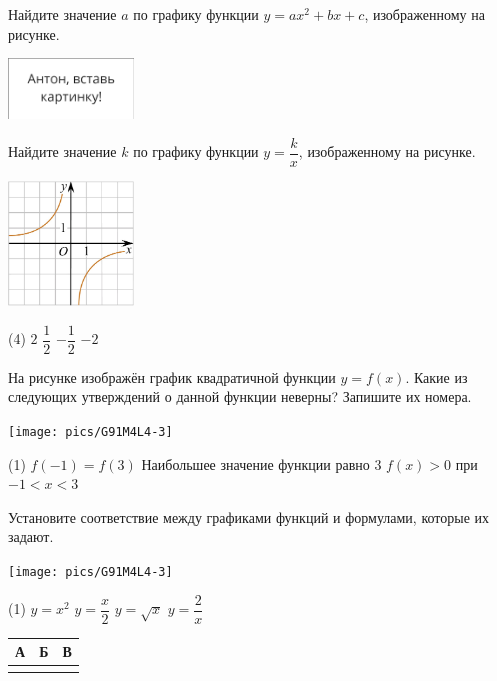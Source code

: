 \begin{class}[number=4]
	\begin{listofex}
	\item Найдите значение \( a \) по графику функции \( y=ax^2+bx+c \), изображенному на рисунке.
	\begin{center}
		\includegraphics[width=0.25\textwidth]{pics/G91M4L4-1}
	\end{center}
	\item Найдите значение \( k \) по графику функции \( y=\dfrac{k}{x} \), изображенному на рисунке.
	\begin{center}
		\includegraphics[width=0.25\textwidth]{pics/G91M4L4-2}
	\end{center}
	\begin{tasks}(4)
		\task \( 2 \)
		\task \( \dfrac{1}{2} \)
		\task \( -\dfrac{1}{2} \)
		\task \( -2 \)
	\end{tasks}
	\item На рисунке изображён график квадратичной функции \( y=f(x) \). Какие из следующих утверждений о данной функции неверны? Запишите их номера.
	\begin{center}
		\texttt{[image: pics/G91M4L4-3]}
	\end{center}
	\begin{tasks}(1)
		\task \( f(-1)=f(3) \)
		\task Наибольшее значение функции равно \( 3 \)
		\task \( f(x)>0 \) при \( -1<x<3 \)
	\end{tasks}
	
	\item Установите соответствие между графиками функций и формулами, которые их задают.
	\begin{center}
		\texttt{[image: pics/G91M4L4-3]}
	\end{center}
	\begin{tasks}(1)
		\task \( y=x^2 \)
		\task \( y=\dfrac{x}{2} \)
		\task \( y=\sqrt{x} \)
		\task \( y=\dfrac{2}{x} \)
	\end{tasks}
	\begin{center}
		\footnotesize
		\begin{tabular}{|c|c|c|}
			\hline
			А&Б&В\\
			\hline
			& & \\
			\hline
		\end{tabular}
	\end{center}
	

\end{listofex}
\end{class}
